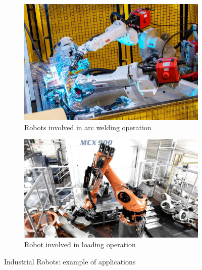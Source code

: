 \begin{figure}[htb]
    \centering
    \begin{subfigure}[b]{0.45\textwidth}
        \includegraphics[width=\textwidth]{figures/images/welding.jpg}
        \caption{Robots involved in arc welding operation}
        \label{fig:welding}
    \end{subfigure}
    \hfill
    \begin{subfigure}[b]{0.5\textwidth}
        \includegraphics[width=\textwidth]{figures/images/loading.jpg}
        \caption{Robot involved in loading operation}
        \label{fig:material_handling}
    \end{subfigure}
   \hfill
   \caption{Industrial Robots: example of applications}
   \label{fig:industrial_robots_example}
\end{figure}

